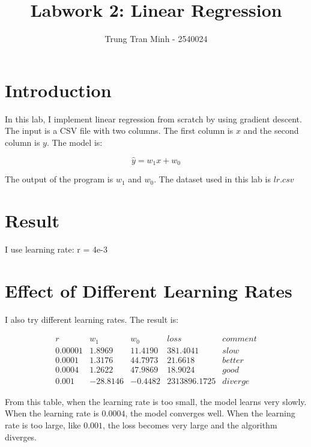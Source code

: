 \documentclass[12pt]{article}
\title{Labwork 2: Linear Regression}
\author{Trung Tran Minh - 2540024}
\date{}
\begin{document}
\maketitle

\section{Introduction}

In this lab, I implement linear regression from scratch by using gradient descent.
The input is a CSV file with two columns. The first column is $x$ and the second column is $y$.
The model is:

\[
\hat{y} = w_1x + w_0
\]

The output of the program is $w_1$ and $w_0$. The dataset used in this lab is $lr.csv$

\section{Result}

I use learning rate: r = 4e-3


\section{Effect of Different Learning Rates}

I also try different learning rates. The result is:

\[
\begin{array}{c|c|c|c|c}
r & w_1 & w_0 & loss & comment \\
\hline
0.00001 & 1.8969 & 11.4190 & 381.4041 & slow \\
0.0001 & 1.3176 & 44.7973 & 21.6618 & better \\
0.0004 & 1.2622 & 47.9869 & 18.9024 & good \\
0.001 & -28.8146 & -0.4482 & 2313896.1725 & diverge
\end{array}
\]

From this table, when the learning rate is too small, the model learns very slowly.
When the learning rate is $0.0004$, the model converges well.
When the learning rate is too large, like $0.001$, the loss becomes very large and the algorithm diverges.
\end{document}
